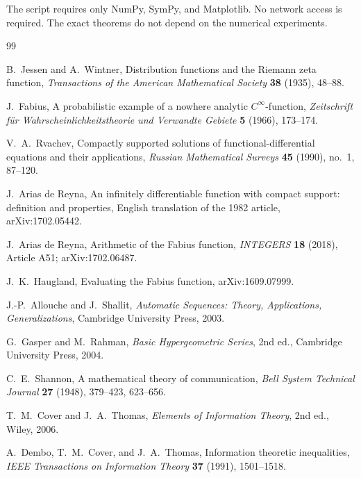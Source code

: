 \documentclass[11pt,oneside]{article}
\theoremstyle{definition}
\theoremstyle{remark}
\begin{document}
The script requires only NumPy, SymPy, and Matplotlib.  No network access is
required.  The exact theorems do not depend on the numerical experiments.

\begin{thebibliography}{99}

B.~Jessen and A.~Wintner,
\newblock Distribution functions and the Riemann zeta function,
\newblock \emph{Transactions of the American Mathematical Society} \textbf{38}
(1935), 48--88.

J.~Fabius,
\newblock A probabilistic example of a nowhere analytic $C^\infty$-function,
\newblock \emph{Zeitschrift f\"ur Wahrscheinlichkeitstheorie und Verwandte
Gebiete} \textbf{5} (1966), 173--174.

V.~A.~Rvachev,
\newblock Compactly supported solutions of functional-differential equations and
their applications,
\newblock \emph{Russian Mathematical Surveys} \textbf{45} (1990), no.~1,
87--120.

J.~Arias de Reyna,
\newblock An infinitely differentiable function with compact support: definition
and properties,
\newblock English translation of the 1982 article, arXiv:1702.05442.

J.~Arias de Reyna,
\newblock Arithmetic of the Fabius function,
\newblock \emph{INTEGERS} \textbf{18} (2018), Article A51;
arXiv:1702.06487.

J.~K.~Haugland,
\newblock Evaluating the Fabius function,
\newblock arXiv:1609.07999.

J.-P.~Allouche and J.~Shallit,
\newblock \emph{Automatic Sequences: Theory, Applications, Generalizations},
\newblock Cambridge University Press, 2003.

G.~Gasper and M.~Rahman,
\newblock \emph{Basic Hypergeometric Series}, 2nd ed.,
\newblock Cambridge University Press, 2004.

C.~E.~Shannon,
\newblock A mathematical theory of communication,
\newblock \emph{Bell System Technical Journal} \textbf{27} (1948), 379--423,
623--656.

T.~M.~Cover and J.~A.~Thomas,
\newblock \emph{Elements of Information Theory}, 2nd ed.,
\newblock Wiley, 2006.

A.~Dembo, T.~M.~Cover, and J.~A.~Thomas,
\newblock Information theoretic inequalities,
\newblock \emph{IEEE Transactions on Information Theory} \textbf{37} (1991),
1501--1518.


\end{thebibliography}
\end{document}
